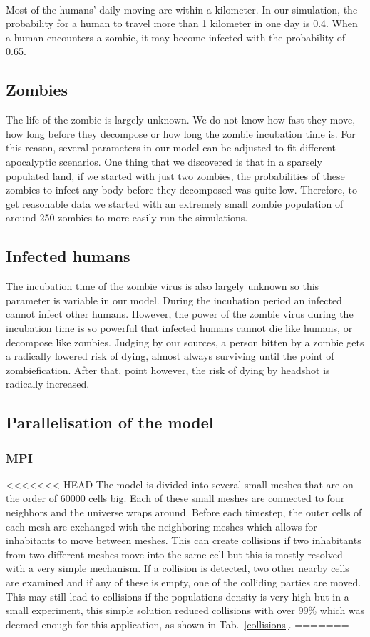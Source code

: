 \documentclass{report}
\begin{document}
\paragraph{}
Most of the humans' daily moving are within a kilometer. In our simulation, the probability for a human to travel more than 1 kilometer in one day is 0.4. When a human encounters a zombie, it may become infected with the probability of 0.65.

\subsection{Zombies}
The life of the zombie is largely unknown. We do not know how fast they move, how long before they decompose or how long the zombie incubation time is. For this reason, several parameters in our model can be adjusted to fit different apocalyptic scenarios. One thing that we discovered is that in a sparsely populated land, if we started with just two zombies, the probabilities of these zombies to infect any body before they decomposed was quite low. Therefore, to get reasonable data we started with an extremely small zombie population of around 250 zombies to more easily run the simulations.

\subsection{Infected humans}
The incubation time of the zombie virus is also largely unknown so this parameter is variable in our model. During the incubation period an infected cannot infect other humans. However, the power of the zombie virus during the incubation time is so powerful that infected humans cannot die like humans, or decompose like zombies. Judging by our sources\cite{deadheads}, a person bitten by a zombie gets a radically lowered risk of dying, almost always surviving until the point of zombiefication. After that, point however, the risk of dying by headshot is radically increased.

\subsection{Parallelisation of the model}
\subsubsection{MPI}
<<<<<<< HEAD
The model is divided into several small meshes that are on the order of 60000 cells big. Each of these small meshes are connected to four neighbors and the universe wraps around. Before each timestep, the outer cells of each mesh are exchanged with the neighboring meshes which allows for inhabitants to move between meshes. This can create collisions if two inhabitants from two different meshes move into the same cell but this is mostly resolved with a very simple mechanism. If a collision is detected, two other nearby cells are examined and if any of these is empty, one of the colliding parties are moved. This may still lead to collisions if the populations density is very high but in a small experiment, this simple solution reduced collisions with over 99\% which was deemed enough for this application, as shown in Tab.~\ref{collisions}.
=======
\end{document}

